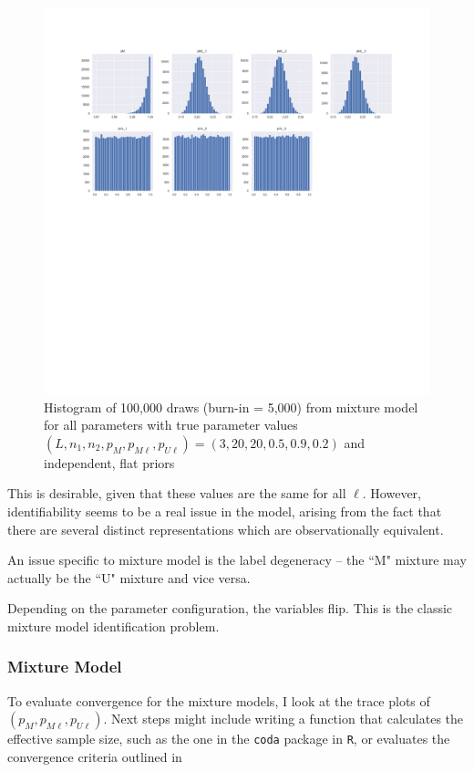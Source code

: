 \documentclass[11pt,reqno]{amsart}
\newcommand\params{(p_M, p_{M\ell}, p_{U\ell})}
\begin{document}
\begin{figure}[h!]
\begin{center}
\includegraphics[width=\textwidth]{../Figures/mm/nM10/allParam_nM10_L3.png}
\vspace{-40pt}
\caption{Histogram of 100,000 draws (burn-in = 5,000) from mixture model for all parameters with true parameter values $(L, n_1, n_2, p_M, p_{M\ell}, p_{U\ell}) = (3, 20, 20, 0.5, 0.9, 0.2)$ and independent, flat priors}
\label{mmFlips}
\end{center}
\end{figure}

This is desirable, given that these values are the same for all $\ell$.  However, identifiability seems to be a real issue in the model, arising from the fact that there are several distinct representations which are observationally equivalent.  

An issue specific to mixture model is the label degeneracy -- the ``M" mixture may actually be the ``U" mixture and vice versa. 


Depending on the parameter configuration, the variables flip.  This is the classic mixture model identification problem.  

\subsubsection{Mixture Model} To evaluate convergence for the mixture models, I look at the trace plots of $\params$.  Next steps might include writing a function that calculates the effective sample size, such as the one in the \texttt{coda} package in \texttt{R}, or evaluates the convergence criteria outlined in %
\end{document}
